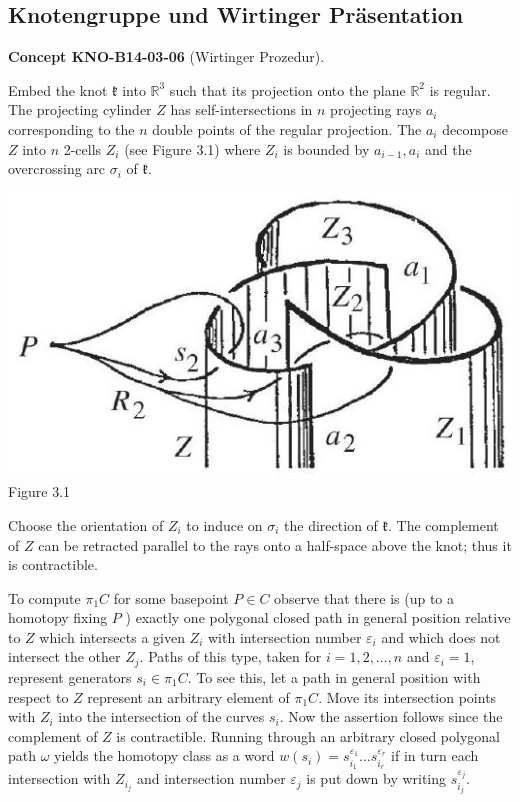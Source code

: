 \documentclass[10pt, letterpaper]{article}
\newcommand{\CustomHeading}[3]{%
  \par\medskip\noindent%
  \textbf{#1 #2} \textnormal{(#3)}.\enskip%
}
\newenvironment{CONC}[2]{\CustomHeading{Concept}{#1}{#2}}{}
\begin{document}
\subsection{Knotengruppe und Wirtinger Präsentation}

\begin{CONC}{KNO-B14-03-06}{Wirtinger Prozedur}
Embed the knot $\mathfrak{k}$ into $\mathbb{R}^{3}$ such that its projection onto the plane $\mathbb{R}^{2}$ is regular. The projecting cylinder $Z$ has self-intersections in $n$ projecting rays $a_{i}$ corresponding to the $n$ double points of the regular projection. The $a_{i}$ decompose $Z$ into $n$ 2-cells $Z_{i}$ (see Figure 3.1) where $Z_{i}$ is bounded by $a_{i-1}, a_{i}$ and the overcrossing arc $\sigma_{i}$ of $\mathfrak{k}$.

\includegraphics[scale=0.2,center]{2025_05_21_9c06be8de7a55410f8c1g-046}
Figure 3.1

Choose the orientation of $Z_{i}$ to induce on $\sigma_{i}$ the direction of $\mathfrak{k}$. The complement of $Z$ can be retracted parallel to the rays onto a half-space above the knot; thus it is contractible.

To compute $\pi_{1} C$ for some basepoint $P \in C$ observe that there is (up to a homotopy fixing $P$ ) exactly one polygonal closed path in general position relative to $Z$ which intersects a given $Z_{i}$ with intersection number $\varepsilon_{i}$ and which does not intersect the other $Z_{j}$. Paths of this type, taken for $i=1,2, \ldots, n$ and $\varepsilon_{i}=1$, represent generators $s_{i} \in \pi_{1} C$. To see this, let a path in general position with respect to $Z$ represent an arbitrary element of $\pi_{1} C$. Move its intersection points with $Z_{i}$ into the intersection of the curves $s_{i}$. Now the assertion follows since the complement of $Z$ is contractible. Running through an arbitrary closed polygonal path $\omega$ yields the homotopy class as a word $w\left(s_{i}\right)=s_{i_{1}}^{\varepsilon_{1}} \ldots s_{i_{r}}^{\varepsilon_{r}}$ if in turn each intersection with $Z_{i_{j}}$ and intersection number $\varepsilon_{j}$ is put down by writing $s_{i_{j}}^{\varepsilon_{j}}$.


\end{CONC}
\end{document}
